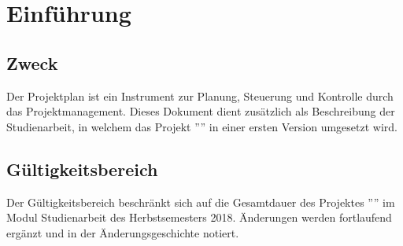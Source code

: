 \section{Einführung}


\subsection{Zweck}
Der Projektplan ist ein Instrument zur Planung, Steuerung und Kontrolle durch das Projektmanagement. Dieses Dokument dient zusätzlich als Beschreibung der Studienarbeit, in welchem das Projekt ''\TITLE'' in einer ersten Version umgesetzt wird.

\subsection{Gültigkeitsbereich}
Der Gültigkeitsbereich beschränkt sich auf die Gesamtdauer des Projektes ''\TITLE'' im Modul Studienarbeit des Herbstsemesters 2018. Änderungen werden fortlaufend ergänzt und in der Änderungsgeschichte notiert.